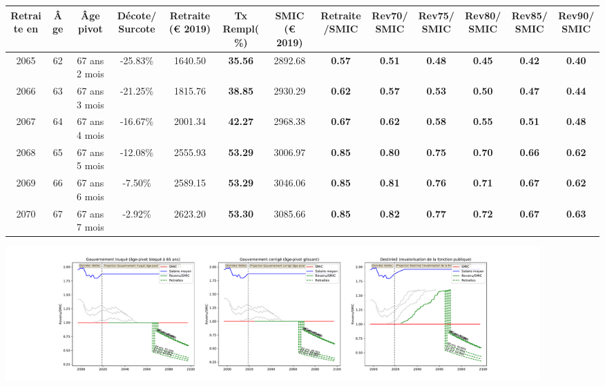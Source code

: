 { \scriptsize \begin{center} 
\begin{tabular}[htb]{|c|c||c|c||c|c||c||c|c|c|c|c|c|} 
\hline 
 Retraite en &  Âge &  Âge pivot &  Décote/Surcote &  Retraite (\euro{} 2019) &  Tx Rempl(\%) &  SMIC (\euro{} 2019) &  Retraite/SMIC &  Rev70/SMIC &  Rev75/SMIC &  Rev80/SMIC &  Rev85/SMIC &  Rev90/SMIC \\ 
\hline \hline 
 2065 &  62 &  67 ans 2 mois &  -25.83\% &  1640.50 &  {\bf 35.56} &  2892.68 &  {\bf {\color{red} 0.57}} &  {\bf {\color{red} 0.51}} &  {\bf {\color{red} 0.48}} &  {\bf {\color{red} 0.45}} &  {\bf {\color{red} 0.42}} &  {\bf {\color{red} 0.40}} \\ 
\hline 
 2066 &  63 &  67 ans 3 mois &  -21.25\% &  1815.76 &  {\bf 38.85} &  2930.29 &  {\bf {\color{red} 0.62}} &  {\bf {\color{red} 0.57}} &  {\bf {\color{red} 0.53}} &  {\bf {\color{red} 0.50}} &  {\bf {\color{red} 0.47}} &  {\bf {\color{red} 0.44}} \\ 
\hline 
 2067 &  64 &  67 ans 4 mois &  -16.67\% &  2001.34 &  {\bf 42.27} &  2968.38 &  {\bf {\color{red} 0.67}} &  {\bf {\color{red} 0.62}} &  {\bf {\color{red} 0.58}} &  {\bf {\color{red} 0.55}} &  {\bf {\color{red} 0.51}} &  {\bf {\color{red} 0.48}} \\ 
\hline 
 2068 &  65 &  67 ans 5 mois &  -12.08\% &  2555.93 &  {\bf 53.29} &  3006.97 &  {\bf {\color{red} 0.85}} &  {\bf {\color{red} 0.80}} &  {\bf {\color{red} 0.75}} &  {\bf {\color{red} 0.70}} &  {\bf {\color{red} 0.66}} &  {\bf {\color{red} 0.62}} \\ 
\hline 
 2069 &  66 &  67 ans 6 mois &  -7.50\% &  2589.15 &  {\bf 53.29} &  3046.06 &  {\bf {\color{red} 0.85}} &  {\bf {\color{red} 0.81}} &  {\bf {\color{red} 0.76}} &  {\bf {\color{red} 0.71}} &  {\bf {\color{red} 0.67}} &  {\bf {\color{red} 0.62}} \\ 
\hline 
 2070 &  67 &  67 ans 7 mois &  -2.92\% &  2623.20 &  {\bf 53.30} &  3085.66 &  {\bf {\color{red} 0.85}} &  {\bf {\color{red} 0.82}} &  {\bf {\color{red} 0.77}} &  {\bf {\color{red} 0.72}} &  {\bf {\color{red} 0.67}} &  {\bf {\color{red} 0.63}} \\ 
\hline 
\hline 
\end{tabular} 
\end{center} } 

 \begin{center}\includegraphics[width=0.9\textwidth]{fig/ATSEM_2003_22_dest_retraite.pdf}\end{center} \label{fig/ATSEM_2003_22_dest_retraite.pdf} 

